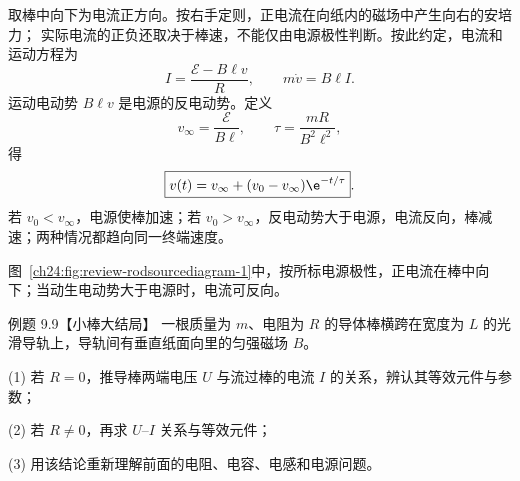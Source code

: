 \begin{xesolution}
取棒中向下为电流正方向。按右手定则，正电流在向纸内的磁场中产生向右的安培力；
实际电流的正负还取决于棒速，不能仅由电源极性判断。按此约定，电流和运动方程为
\begin{equation}
  I=\frac{\mathcal E-B\ell v}{R},
  \qquad
  m\dot v=B\ell I.
\end{equation}
运动电动势 $B\ell v$ 是电源的反电动势。定义
\begin{equation}
  v_\infty=\frac{\mathcal E}{B\ell},
  \qquad \tau=\frac{mR}{B^2\ell^2},
\end{equation}
得
\begin{equation}
  \boxed{v(t)=v_\infty+(v_0-v_\infty)\e^{-t/\tau}}.
\end{equation}
若 $v_0<v_\infty$，电源使棒加速；若 $v_0>v_\infty$，反电动势大于电源，电流反向，棒减速；两种情况都趋向同一终端速度。

图~\ref{ch24:fig:review-rodsourcediagram-1}中，按所标电源极性，正电流在棒中向下；当动生电动势大于电源时，电流可反向。
\par\noindent\begin{minipage}{\linewidth}
\rodSourceDiagram
{}\label{ch24:fig:review-rodsourcediagram-1}
\end{minipage}\par\medskip
\end{xesolution}

\begin{origexamplebox}{例题 9.9【小棒大结局】}
一根质量为 $m$、电阻为 $R$ 的导体棒横跨在宽度为 $L$ 的光滑导轨上，导轨间有垂直纸面向里的匀强磁场 $B$。

(1) 若 $R=0$，推导棒两端电压 $U$ 与流过棒的电流 $I$ 的关系，辨认其等效元件与参数；

(2) 若 $R\ne0$，再求 $U$--$I$ 关系与等效元件；

(3) 用该结论重新理解前面的电阻、电容、电感和电源问题。

\begin{center}\end{center}
\label{fig:em24-question-9}
\end{origexamplebox}

